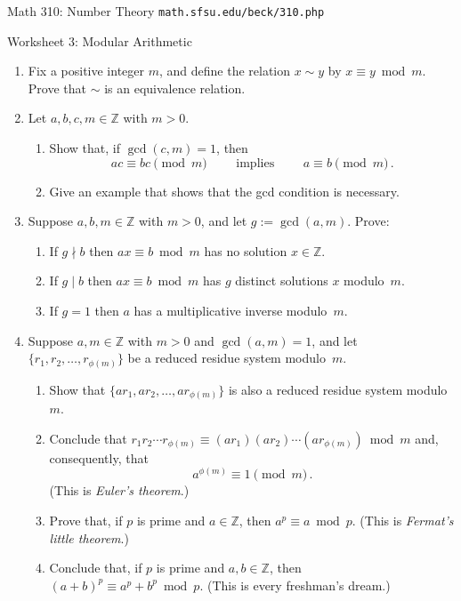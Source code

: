 \documentclass[11pt]{article}
\def\Z{\mathbb{Z}}
\begin{document}
\setlength{\parindent}{0pt}
\setlength{\parskip}{0.2cm}

{ Math 310: Number Theory}
\hfill
{\tt math.sfsu.edu/beck/310.php}

\vspace{.3in}

\begin{center}
\Large{Worksheet 3: Modular Arithmetic}
\end{center}

\begin{enumerate}

\item Fix a positive integer $m$, and define the relation $x \sim y$ by $x \equiv y \bmod m$.
Prove that $\sim$ is an equivalence relation.

\item Let $a,b,c,m \in \Z$ with $m > 0$.
  \begin{enumerate}
  \item Show that, if $\gcd(c,m) = 1$, then
  \[
    ac \equiv bc \pmod m
    \qquad \text{ implies } \qquad
    a \equiv b  \pmod m \, .
  \]
  \item Give an example that shows that the gcd condition is necessary.
  \end{enumerate}

\item Suppose $a,b,m \in \Z$ with $m > 0$, and let $g := \gcd(a,m)$. Prove:
  \begin{enumerate}
  \item If $g \nmid b$ then $ax \equiv b \bmod m$ has no solution $x \in \Z$.
  \item If $g \mid b$ then $ax \equiv b \bmod m$ has $g$ distinct solutions $x$ modulo~$m$.
  \item If $g = 1$ then $a$ has a multiplicative inverse modulo~$m$.
  \end{enumerate}

\item Suppose $a,m \in \Z$ with $m > 0$ and $\gcd(a,m) = 1$, and let $\{ r_1, r_2, \dots, r_{ \phi(m) } \}$ be a
reduced residue system modulo~$m$.
  \begin{enumerate}
  \item Show that $\{ a r_1, a r_2, \dots, a r_{ \phi(m) } \}$ is also a reduced residue system modulo~$m$.
  \item Conclude that $r_1 r_2 \cdots r_{ \phi(m) } \equiv (a r_1) (a r_2) \cdots (a r_{ \phi(m) }) \bmod m$ and,
consequently, that
  \[
    a^{ \phi(m) } \equiv 1 \pmod m \, .
  \]
  (This is \emph{Euler's theorem}.)
  \item Prove that, if $p$ is prime and $a \in \Z$, then $a^p \equiv a \bmod p$.
  (This is \emph{Fermat's little theorem}.)
  \item Conclude that, if $p$ is prime and $a,b \in \Z$, then $(a+b)^p \equiv a^p + b^p \bmod p$.
  (This is every freshman's dream.)
  \end{enumerate}


\end{enumerate}
\end{document}
